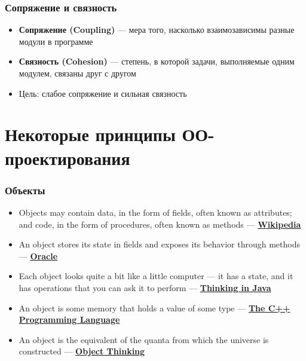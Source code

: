 \documentclass{../../slides-style}
\begin{document}
    \begin{frame}
        \frametitle{Сопряжение и связность}
        \begin{itemize}
            \item \textbf{Сопряжение (Coupling)} --- мера того, насколько взаимозависимы разные модули в программе
            \item \textbf{Связность (Cohesion)} --- степень, в которой задачи, выполняемые одним модулем, связаны друг с другом
            \item Цель: слабое сопряжение и сильная связность
        \end{itemize}
    \end{frame}

    \section{Некоторые принципы ОО-проектирования}

    \begin{frame}
        \frametitle{Объекты}
        \begin{itemize}
            \item Objects may contain data, in the form of fields, often known as attributes; and code, in the form of procedures, often known as methods --- \textbf{\href{https://en.wikipedia.org/wiki/Object-oriented\_programming}{Wikipedia}}
            \item An object stores its state in fields and exposes its behavior through methods --- \textbf{\href{https://docs.oracle.com/javase/tutorial/java/concepts/object.html}{Oracle}}
            \item Each object looks quite a bit like a little computer --- it has a state, and it has operations that you can ask it to perform --- \textbf{\href{http://amzn.to/1PBmQpm}{Thinking in Java}}
            \item An object is some memory that holds a value of some type --- \textbf{\href{http://amzn.to/1XyGCtk}{The C++ Programming Language}}
            \item An object is the equivalent of the quanta from which the universe is constructed --- \textbf{\href{http://amzn.to/266oJr4}{Object Thinking}}
        \end{itemize}
    \end{frame}
\end{document}
